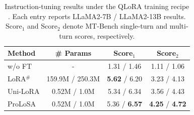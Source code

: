 \begin{table}[htbp]
\centering
\small
\begin{tabular}{lccc}
\toprule
\textbf{Method} & \textbf{\# Params} & \textbf{Score$_1$} & \textbf{Score$_2$} \\
\midrule
w/o FT       & -       & 1.31 / 1.46 & 1.11 / 1.06 \\
LoRA$^{\#}$  & 159.9M / 250.3M & \textbf{5.62} / 6.20 & 3.23 / 4.13 \\
Uni-LoRA     & 0.52M / 1.0M    & 5.34 / 6.34 & 3.56 / 4.43 \\
ProLoSA      & 0.52M / 1.0M    & 5.36 / \textbf{6.57} & \textbf{4.25} / \textbf{4.72} \\
\bottomrule
\end{tabular}
\caption{
Instruction-tuning results under the QLoRA training recipe \citep{dettmers2023qlora}. 
Each entry reports LLaMA2-7B / LLaMA2-13B results. 
Score$_1$ and Score$_2$ denote MT-Bench single-turn and multi-turn scores, respectively.
}
\label{tab:instruction}
\end{table}

